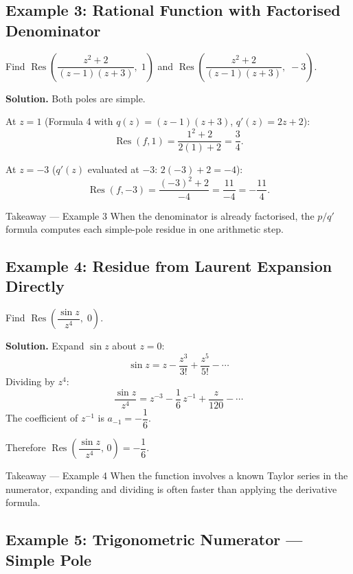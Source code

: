 \documentclass[12pt,a4paper]{article}
\begin{document}
\subsection*{Example 3: Rational Function with Factorised Denominator}

Find $\operatorname{Res}\!\left(\dfrac{z^2+2}{(z-1)(z+3)},\; 1\right)$ and
$\operatorname{Res}\!\left(\dfrac{z^2+2}{(z-1)(z+3)},\; -3\right)$.

\textbf{Solution.} Both poles are simple.

At $z = 1$ (Formula 4 with $q(z) = (z-1)(z+3)$, $q'(z) = 2z+2$):
\[
   \operatorname{Res}(f, 1) = \frac{1^2+2}{2(1)+2} = \frac{3}{4}.
\]

At $z = -3$ ($q'(z)$ evaluated at $-3$: $2(-3)+2 = -4$):
\[
   \operatorname{Res}(f,-3) = \frac{(-3)^2+2}{-4} = \frac{11}{-4} = -\frac{11}{4}.
\]

\begin{learnbox}{Takeaway --- Example 3}
When the denominator is already factorised, the $p/q'$ formula computes each simple-pole
residue in one arithmetic step.
\end{learnbox}

\subsection*{Example 4: Residue from Laurent Expansion Directly}

Find $\operatorname{Res}\!\left(\dfrac{\sin z}{z^4},\; 0\right)$.

\textbf{Solution.}
Expand $\sin z$ about $z = 0$:
\[
   \sin z = z - \frac{z^3}{3!} + \frac{z^5}{5!} - \cdots
\]
Dividing by $z^4$:
\[
   \frac{\sin z}{z^4} = z^{-3} - \frac{1}{6}\,z^{-1} + \frac{z}{120} - \cdots
\]
The coefficient of $z^{-1}$ is $a_{-1} = -\dfrac{1}{6}$.

Therefore $\operatorname{Res}\!\left(\dfrac{\sin z}{z^4},\, 0\right) = -\dfrac{1}{6}$.

\begin{learnbox}{Takeaway --- Example 4}
When the function involves a known Taylor series in the numerator, expanding and dividing is
often faster than applying the derivative formula.
\end{learnbox}

\subsection*{Example 5: Trigonometric Numerator --- Simple Pole}
\end{document}
